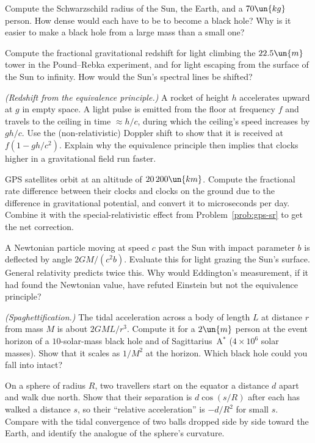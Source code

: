 \begin{problems}
\core Compute the Schwarzschild radius of the Sun, the Earth, and a $70\un{kg}$ person. How dense would each have to be to become a black hole? Why is it easier to make a black hole from a large mass than a small one?

 Compute the fractional gravitational redshift for light climbing the $22.5\un{m}$ tower in the Pound--Rebka experiment, and for light escaping from the surface of the Sun to infinity. How would the Sun's spectral lines be shifted?

\core \label{prob:redshift} \emph{(Redshift from the equivalence principle.)} A rocket of height $h$ accelerates upward at $g$ in empty space. A light pulse is emitted from the floor at frequency $f$ and travels to the ceiling in time $\approx h/c$, during which the ceiling's speed increases by $gh/c$. Use the (non-relativistic) Doppler shift to show that it is received at $f(1 - gh/c^2)$. Explain why the equivalence principle then implies that clocks higher in a gravitational field run faster.

\core GPS satellites orbit at an altitude of $20\,200\un{km}$. Compute the fractional rate difference between their clocks and clocks on the ground due to the difference in gravitational potential, and convert it to microseconds per day. Combine it with the special-relativistic effect from Problem~\ref{prob:gps-sr} to get the net correction.

\core \label{prob:deflection} A Newtonian particle moving at speed $c$ past the Sun with impact parameter $b$ is deflected by angle $2GM/(c^2b)$. Evaluate this for light grazing the Sun's surface. General relativity predicts twice this. Why would Eddington's measurement, if it had found the Newtonian value, have refuted Einstein but not the equivalence principle?

\core \label{prob:spaghetti} \emph{(Spaghettification.)} The tidal acceleration across a body of length $L$ at distance $r$ from mass $M$ is about $2GML/r^3$. Compute it for a $2\un{m}$ person at the event horizon of a $10$-solar-mass black hole and of Sagittarius~A$^*$ ($4\times10^6$ solar masses). Show that it scales as $1/M^2$ at the horizon. Which black hole could you fall into intact?

 On a sphere of radius $R$, two travellers start on the equator a distance $d$ apart and walk due north. Show that their separation is $d\cos(s/R)$ after each has walked a distance $s$, so their ``relative acceleration'' is $-d/R^2$ for small $s$. Compare with the tidal convergence of two balls dropped side by side toward the Earth, and identify the analogue of the sphere's curvature.


\end{problems}
